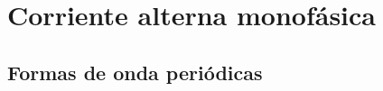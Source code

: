 \documentclass[11pt]{book} %
\begin{document}
\begin{enumerate}






\end{enumerate}
	

	
 	\chapter{Corriente alterna monofásica}\label{chap.ca_mono}
 	
 	\section{Formas de onda periódicas}
 	
\end{document}
